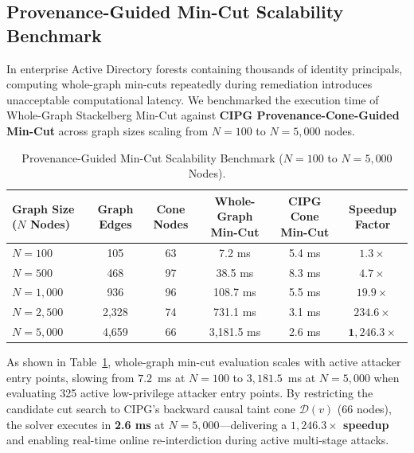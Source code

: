 \subsection{Provenance-Guided Min-Cut Scalability Benchmark}
\label{sec:scalability_benchmark}
In enterprise Active Directory forests containing thousands of identity principals, computing whole-graph min-cuts repeatedly during remediation introduces unacceptable computational latency. We benchmarked the execution time of Whole-Graph Stackelberg Min-Cut against \textbf{CIPG Provenance-Cone-Guided Min-Cut} across graph sizes scaling from $N=100$ to $N=5,000$ nodes.

\begin{table}[ht]
\centering
\caption{Provenance-Guided Min-Cut Scalability Benchmark ($N=100$ to $N=5,000$ Nodes).}
\label{tab:provenance_scalability_benchmark}
\small
\begin{tabularx}{\textwidth}{lccccc}
\toprule
\textbf{Graph Size ($N$ Nodes)} & \textbf{Graph Edges} & \textbf{Cone Nodes} & \textbf{Whole-Graph Min-Cut} & \textbf{CIPG Cone Min-Cut} & \textbf{Speedup Factor} \\
\midrule
$N = 100$   & 105   & 63 & 7.2 ms    & 5.4 ms  & $1.3\times$ \\
$N = 500$   & 468   & 97 & 38.5 ms   & 8.3 ms  & $4.7\times$ \\
$N = 1,000$ & 936   & 96 & 108.7 ms  & 5.5 ms  & $19.9\times$ \\
$N = 2,500$ & 2,328 & 74 & 731.1 ms  & 3.1 ms  & $234.6\times$ \\
$N = 5,000$ & 4,659 & 66 & 3,181.5 ms & 2.6 ms  & $\mathbf{1,246.3\times}$ \\
\bottomrule
\end{tabularx}
\end{table}

As shown in Table~\ref{tab:provenance_scalability_benchmark}, whole-graph min-cut evaluation scales with active attacker entry points, slowing from $7.2$~ms at $N=100$ to $3,181.5$~ms at $N=5,000$ when evaluating 325 active low-privilege attacker entry points. By restricting the candidate cut search to CIPG's backward causal taint cone $\mathcal{D}(v)$ ($66$ nodes), the solver executes in \textbf{2.6 ms} at $N=5,000$—delivering a \textbf{$1,246.3\times$ speedup} and enabling real-time online re-interdiction during active multi-stage attacks.
